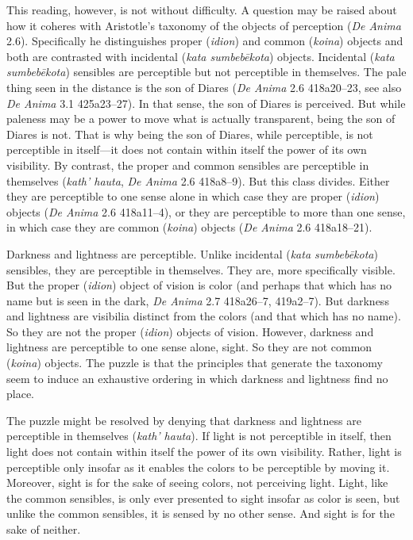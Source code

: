 This reading, however, is not without difficulty. A question may be raised about how it coheres with Aristotle's taxonomy of the objects of perception (\emph{De Anima} 2.6). Specifically he distinguishes proper (\emph{idion}) and common (\emph{koina}) objects and both are contrasted with incidental (\emph{kata sumbebēkota}) objects. Incidental (\emph{kata sumbebēkota}) sensibles are perceptible but not perceptible in themselves. The pale thing seen in the distance is the son of Diares (\emph{De Anima} 2.6 418a20–23, see also \emph{De Anima} 3.1 425a23–27). In that sense, the son of Diares is perceived. But while paleness may be a power to move what is actually transparent, being the son of Diares is not. That is why being the son of Diares, while perceptible, is not perceptible in itself—it does not contain within itself the power of its own visibility. By contrast, the proper and common sensibles are perceptible in themselves (\emph{kath' hauta}, \emph{De Anima} 2.6 418a8–9). But this class divides. Either they are perceptible to one sense alone in which case they are proper (\emph{idion}) objects (\emph{De Anima} 2.6 418a11–4), or they are perceptible to more than one sense, in which case they are common (\emph{koina}) objects (\emph{De Anima} 2.6 418a18–21).

Darkness and lightness are perceptible. Unlike incidental (\emph{kata sumbebēkota}) sensibles, they are perceptible in themselves. They are, more specifically visible. But the proper (\emph{idion}) object of vision is color (and perhaps that which has no name but is seen in the dark, \emph{De Anima} 2.7 418a26–7, 419a2–7). But darkness and lightness are visibilia distinct from the colors (and that which has no name). So they are not the proper (\emph{idion}) objects of vision. However, darkness and lightness are perceptible to one sense alone, sight. So they are not common (\emph{koina}) objects. The puzzle is that the principles that generate the taxonomy seem to induce an exhaustive ordering in which darkness and lightness find no place. 

The puzzle might be resolved by denying that darkness and lightness are perceptible in themselves (\emph{kath' hauta}). If light is not perceptible in itself, then light does not contain within itself the power of its own visibility. Rather, light is perceptible only insofar as it enables the colors to be perceptible by moving it. Moreover, sight is for the sake of seeing colors, not perceiving light. Light, like the common sensibles, is only ever presented to sight insofar as color is seen, but unlike the common sensibles, it is sensed by no other sense. And sight is for the sake of neither.

